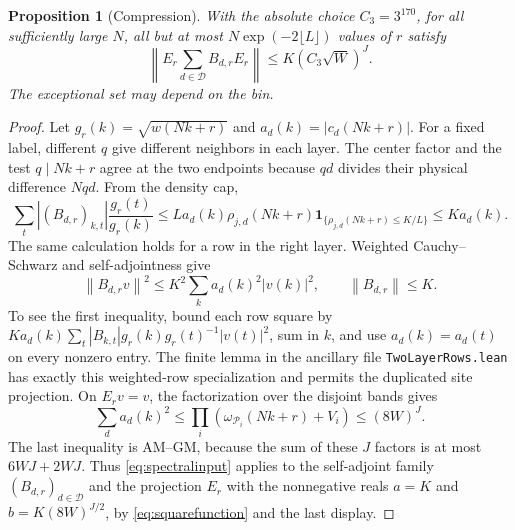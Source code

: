\documentclass[11pt]{article}
\newtheorem{proposition}[theorem]{Proposition}
\theoremstyle{definition}
\newcommand{\ind}{\mathbf 1}
\newcommand{\norm}[1]{\left\lVert#1\right\rVert}
\begin{document}
\begin{proposition}[Compression]\label{prop:compression}
With the absolute choice $C_3=3^{170}$, for all sufficiently large
$N$, all but at most $N\exp(-2\lfloor L\rfloor)$ values of $r$ satisfy
\begin{equation}\label{eq:compression}
 \norm{E_r\sum_{d\in\mathcal D}B_{d,r}E_r}
 \le K(C_3\sqrt W)^J.
\end{equation}
The exceptional set may depend on the bin.
\end{proposition}
\begin{proof}
Let $g_r(k)=\sqrt{w(Nk+r)}$ and $a_d(k)=|c_d(Nk+r)|$.
For a fixed label, different $q$ give different neighbors in each layer.
The center factor and the test $q\mid Nk+r$ agree at the two endpoints
because $qd$ divides their physical difference $Nqd$.
From the density cap,
\[
 \sum_t|(B_{d,r})_{k,t}|\frac{g_r(t)}{g_r(k)}
 \le L a_d(k)\rho_{j,d}(Nk+r)
             \ind_{\{\rho_{j,d}(Nk+r)\le K/L\}}
 \le K a_d(k).
\]
The same calculation holds for a row in the right layer.
Weighted Cauchy--Schwarz and self-adjointness give
\begin{equation}\label{eq:squarefunction}
 \norm{B_{d,r}v}^2
 \le K^2\sum_k a_d(k)^2|v(k)|^2,
 \qquad\norm{B_{d,r}}\le K.
\end{equation}
To see the first inequality, bound each row square by
$K a_d(k)\sum_t|B_{k,t}|g_r(k)g_r(t)^{-1}|v(t)|^2$,
sum in $k$, and use $a_d(k)=a_d(t)$ on every nonzero entry.
The finite lemma  in
the ancillary file \texttt{TwoLayerRows.lean} has exactly this weighted-row
specialization and permits the duplicated site projection.
On $E_rv=v$, the factorization over the disjoint bands gives
\[
 \sum_d a_d(k)^2
 \le\prod_i(\omega_{\mathcal P_i}(Nk+r)+V_i)
 \le(8W)^J.
\]
The last inequality is AM--GM, because the sum of these $J$ factors
is at most $6WJ+2WJ$.
Thus \eqref{eq:spectralinput} applies to the self-adjoint family
$(B_{d,r})_{d\in\mathcal D}$ and the projection $E_r$ with the
nonnegative reals $a=K$ and $b=K(8W)^{J/2}$, by
\eqref{eq:squarefunction} and the last display.


\end{proof}
\end{document}
